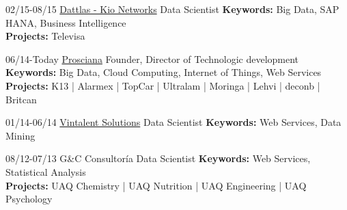 \documentclass[]{friggeri-cv}
\begin{document}
\begin{entrylist}
\entry
{02/15-08/15}
{\href{http://www.dattlas.com}{Dattlas - Kio Networks}}
{Data Scientist} 
{\textbf{Keywords:} Big Data, SAP HANA, Business Intelligence\\
\textbf{Projects:} Televisa
}

\entry
{06/14-Today}
{\href{http://www.prosciana.com}{Prosciana}}
{Founder, Director of Technologic development} 
{\textbf{Keywords:} Big Data, Cloud Computing, Internet of Things, Web Services\\
\textbf{Projects:} K13 | Alarmex | TopCar | Ultralam | Moringa | Lehvi | deconb | Britcan
}

\entry
{01/14-06/14}
{\href{http://www.vintalent.com}{Vintalent Solutions}}
{Data Scientist}
{\textbf{Keywords:} Web Services, Data Mining}


\entry
{%
08/12-07/13}
{G\&C Consultor\'{i}a}
{Data Scientist}
{\textbf{Keywords:} Web Services, Statistical Analysis\\
\textbf{Projects:} UAQ Chemistry | UAQ Nutrition | UAQ Engineering | UAQ Psychology 
}



%
\end{entrylist}
\end{document}
